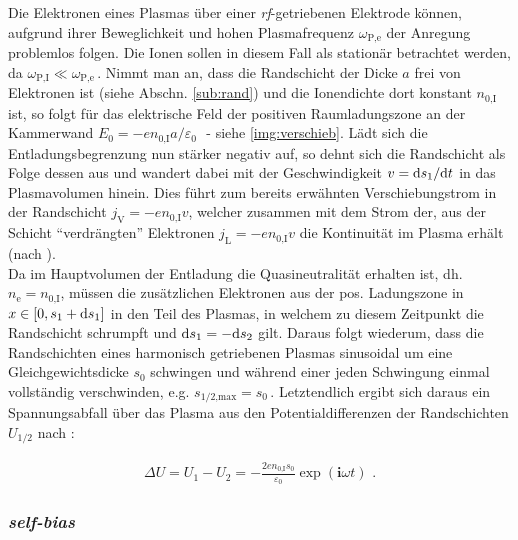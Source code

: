 \documentclass[numbers=noenddot,a4paper]{scrartcl}
\newcommand{\diff}{\textnormal{d}}
\newcommand{\ix}[1]{_\text{#1}}
\newcommand{\imag}{\mathbf{i}}
\newcommand{\tilt}[1]{\textit{#1}}
\begin{document}
				Die Elektronen eines Plasmas über einer \tilt{rf}-getriebenen Elektrode können, aufgrund ihrer Beweglichkeit und hohen Plasmafrequenz $\omega\ix{P,e}$ der Anregung problemlos folgen. Die Ionen sollen in diesem Fall als stationär betrachtet werden, da $\omega\ix{P,I}\ll\omega\ix{P,e}\,$. Nimmt man an, dass die Randschicht der Dicke $a$ frei von Elektronen ist (siehe Abschn. \ref{sub:rand}) und die Ionendichte dort konstant $n\ix{0,I}$ ist, so folgt für das elektrische Feld der positiven Raumladungszone an der Kammerwand $E\ix{0}=-en\ix{0,I}a/\varepsilon\ix{0}\,\,$ - siehe \ref{img:verschieb}. Lädt sich die Entladungsbegrenzung nun stärker negativ auf, so dehnt sich die Randschicht als Folge dessen aus und wandert dabei mit der Geschwindigkeit $v=\diff s\ix{1}/\diff t$ in das Plasmavolumen hinein. Dies führt zum bereits erwähnten Verschiebungstrom in der Randschicht $j\ix{V}=-en\ix{0,I}v$, welcher zusammen mit dem Strom der, aus der Schicht "`verdrängten"' Elektronen $j\ix{L}=-en\ix{0,I}v$ die Kontinuität im Plasma erhält (nach \cite{Godyak90d}).\\
				Da im Hauptvolumen der Entladung die Quasineutralität erhalten ist, dh. $n\ix{e}=n\ix{0,I}$, müssen die zusätzlichen Elektronen aus der pos. Ladungszone in $x\in\left[0,s\ix{1}+\diff s\ix{1}\right]$ in den Teil des Plasmas, in welchem zu diesem Zeitpunkt die Randschicht schrumpft und $\diff s\ix{1}=-\diff s\ix{2}$ gilt. Daraus folgt wiederum, dass die Randschichten eines harmonisch getriebenen Plasmas sinusoidal um eine Gleichgewichtsdicke $s\ix{0}$ schwingen und während einer jeden Schwingung einmal vollständig verschwinden, e.g. $s\ix{1/2,max}=s\ix{0}\,$.  Letztendlich ergibt sich daraus ein Spannungsabfall über das Plasma aus den Potentialdifferenzen der Randschichten $U\ix{1/2}$ nach \cite{Piel10}:

					\begin{align}
						\Delta U=U\ix{1}-U\ix{2}=-\frac{2en\ix{0,I}s\ix{0}}{\varepsilon\ix{0}}\exp\left(\imag\omega t\right)\,\,.
					\end{align}

				\subsubsection{\tilt{self-bias}}  \label{subsub:self-bias}
\end{document}
